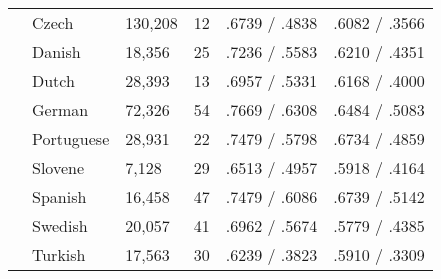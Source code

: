 \begin{table}[ht]
\begin{flushleft}
\begin{tabular}{|@{ }l@{ }|@{ }l@{ }|@{ }l@{ }|@{ }l@{ }|@{ }l@{ }|@{ }l@{ }|}
        & Czech      & 130,208 & 12 & .6739 / .4838 & .6082 / .3566\\
        & Danish     & 18,356  & 25 & .7236 / .5583 & .6210 / .4351\\
        & Dutch      & 28,393  & 13 & .6957 / .5331 & .6168 / .4000\\
        & German     & 72,326  & 54 & .7669 / .6308 & .6484 / .5083\\
        & Portuguese & 28,931  & 22 & .7479 / .5798 & .6734 / .4859\\
        & Slovene    & 7,128   & 29 & .6513 / .4957 & .5918 / .4164\\
        & Spanish    & 16,458  & 47 & .7479 / .6086 & .6739 / .5142\\
        & Swedish    & 20,057  & 41 & .6962 / .5674 & .5779 / .4385\\
        & Turkish    & 17,563  & 30 & .6239 / .3823 & .5910 / .3309\\ \hline
    \end{tabular}
  \end{flushleft}
  \label{tab:multiresults}
\end{table}
